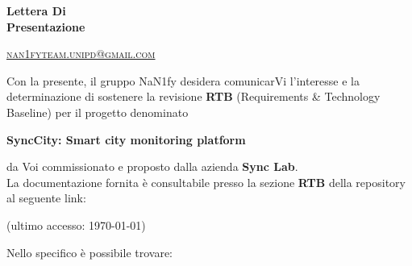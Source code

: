 \documentclass[8pt]{article}
\begin{document}
\begin{titlepage}
\begin{minipage}[t]{0.47\textwidth}
{		}
		\vspace{4mm}\vspace{4mm}
	\end{minipage}
	\vspace{4cm}
	\begin{center}
		\begin{flushright}
			{\fontsize{30pt}{52pt}\selectfont \textbf{Lettera Di \\Presentazione\\}} %
		\end{flushright}
		\vspace{3cm}
	\end{center}
	\vspace{8.5 cm}
	{\small \textsc{\href{mailto: nan1fyteam.unipd@gmail.com}{nan1fyteam.unipd@gmail.com}}}
\end{titlepage}
\pagestyle{mystyle}
\newpage
Con la presente, il gruppo NaN1fy desidera comunicarVi l'interesse e la determinazione di sostenere
la revisione \textbf{RTB} (Requirements \& Technology Baseline) per il
progetto denominato\\
\begin{center}
	\textbf{SyncCity: Smart city monitoring platform}
\end{center}
da Voi commissionato e proposto dalla azienda \textbf{Sync Lab}.
\vspace{1em}
\\La documentazione fornita è consultabile presso la sezione \textbf{RTB} della repository al seguente link:
\begin{center}
	\textbf{\href{https://github.com/NaN1fy/docs/tree/main/documents/RTB}{\color{myblue}{https://github.com/NaN1fy/docs/tree/main/documents/RTB}}}
    (ultimo accesso: \today)
\end{center}
Nello specifico è possibile trovare:
\end{document}
